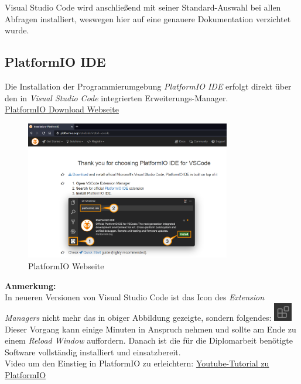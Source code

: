 Visual Studio Code wird anschließend mit seiner Standard-Auswahl bei allen Abfragen installiert, weswegen hier auf eine genauere Dokumentation verzichtet wurde.

\newpage
\subsection{PlatformIO IDE}
Die Installation der Programmierumgebung \textit{PlatformIO IDE} erfolgt direkt über den in \textit{Visual Studio Code} integrierten Erweiterungs-Manager.\\
\href{https://platformio.org/install/ide?install=vscode}{PlatformIO Download Webseite}
\begin{figure}[h]
	\centering
	\includegraphics[width=0.8\textwidth]{bilder/Webseite_PlatformIO.png}
	\caption{PlatformIO Webseite}
\end{figure}

\textbf{Anmerkung:}\\
In neueren Versionen von Visual Studio Code ist das Icon des \textit{Extension Managers} nicht mehr das in obiger Abbildung gezeigte, sondern folgendes:
\includegraphics[align=t,width=0.8cm]{bilder/Icon_Extension_Manager.png}\\

Dieser Vorgang kann einige Minuten in Anspruch nehmen und sollte am Ende zu einem \textit{Reload Window} auffordern. Danach ist die für die Diplomarbeit benötigte Software vollständig installiert und einsatzbereit.\\

Video um den Einstieg in PlatformIO zu erleichtern: \href{https://youtu.be/JmvMvIphMnY?t=715}{Youtube-Tutorial zu PlatformIO}\\
